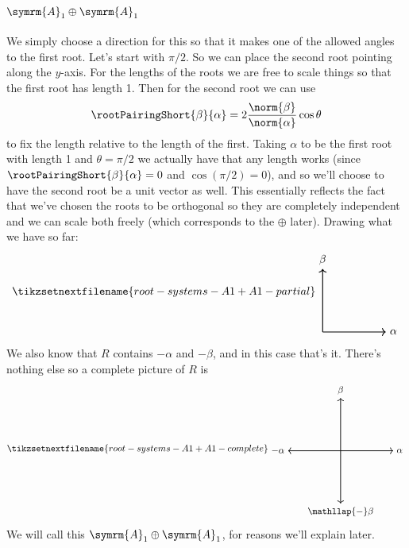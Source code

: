 \documentclass[fleqn]{NotesClass}
\newcommand{\dynkin}[2]{\symrm{#1}_{#2}}
\begin{document}
    \subsection{\texorpdfstring{\(\dynkin{A}{1} \oplus \dynkin{A}{1}\)}{A1 + A1}}
    We simply choose a direction for this so that it makes one of the allowed angles to the first root.
    Let's start with \(\pi/2\).
    So we can place the second root pointing along the \(y\)-axis.
    For the lengths of the roots we are free to scale things so that the first root has length 1.
    Then for the second root we can use
    \begin{equation}
        \rootPairingShort{\beta}{\alpha} = 2\frac{\norm{\beta}}{\norm{\alpha}} \cos \theta
    \end{equation}
    to fix the length relative to the length of the first.
    Taking \(\alpha\) to be the first root with length 1 and \(\theta = \pi/2\) we actually have that any length works (since \(\rootPairingShort{\beta}{\alpha} = 0\) and \(\cos (\pi/2) = 0\)), and so we'll choose to have the second root be a unit vector as well.
    This essentially reflects the fact that we've chosen the roots to be orthogonal so they are completely independent and we can scale both freely (which corresponds to the \(\oplus\) later).
    Drawing what we have so far:
    \begin{equation}
        \tikzsetnextfilename{root-systems-A1+A1-partial}
        \begin{tikzpicture}[baseline=(current bounding box)]
            \draw[->, thick] (0, 0) -- (2, 0) node [right] {\(\alpha\)};
            \draw[->, thick] (0, 0) -- (0, 2) node [above] {\(\beta\)};
        \end{tikzpicture}
    \end{equation}
    We also know that \(R\) contains \(-\alpha\) and \(-\beta\), and in this case that's it.
    There's nothing else so a complete picture of \(R\) is
    \begin{equation}
        \label{eqn:A1+A1 root system}
        \tikzsetnextfilename{root-systems-A1+A1-complete}
        \begin{tikzpicture}[baseline=(current bounding box)]
            \draw[->, thick] (0, 0) -- (2, 0) node [right] {\(\alpha\)};
            \draw[->, thick] (0, 0) -- (0, 2) node [above] {\(\beta\)};
            \draw[->, thick] (0, 0) -- (-2, 0) node [left] {\(-\alpha\)};
            \draw[->, thick] (0, 0) -- (0, -2) node [below] {\(\mathllap{-}\beta\)};
        \end{tikzpicture}
    \end{equation}
    We will call this \(\dynkin{A}{1} \oplus \dynkin{A}{1}\), for reasons we'll explain later.
    
\end{document}

